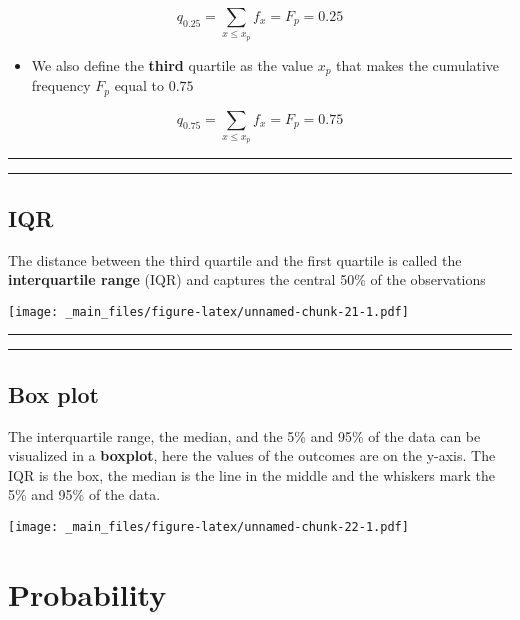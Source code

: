 \documentclass[
]{book}
\providecommand{\tightlist}{%
  \setlength{\itemsep}{0pt}\setlength{\parskip}{0pt}}
\begin{document}
\[q_{0.25}=\sum_{x\leq x_p} f_x =F_p=0.25\]

\begin{itemize}
\tightlist
\item
  We also define the \textbf{third} quartile as the value \(x_p\) that makes the cumulative frequency \(F_p\) equal to \(0.75\)
\end{itemize}

\[q_{0.75}=\sum_{x\leq x_p} f_x =F_p=0.75\]

\begin{center}\rule{0.5\linewidth}{0.5pt}\end{center}

\begin{center}\rule{0.5\linewidth}{0.5pt}\end{center}

\hypertarget{iqr-1}{%
\section{IQR}\label{iqr-1}}

The distance between the third quartile and the first quartile is called the \textbf{interquartile range} (IQR) and captures the central 50\% of the observations

\texttt{[image: \_main\_files/figure-latex/unnamed-chunk-21-1.pdf]}

\begin{center}\rule{0.5\linewidth}{0.5pt}\end{center}

\begin{center}\rule{0.5\linewidth}{0.5pt}\end{center}

\hypertarget{box-plot}{%
\section{Box plot}\label{box-plot}}

The interquartile range, the median, and the 5\% and 95\% of the data can be visualized in a \textbf{boxplot}, here the values of the outcomes are on the y-axis. The IQR is the box, the median is the line in the middle and the whiskers mark the 5\% and 95\% of the data.

\texttt{[image: \_main\_files/figure-latex/unnamed-chunk-22-1.pdf]}

\hypertarget{probability}{%
\chapter{Probability}\label{probability}}
\end{document}
